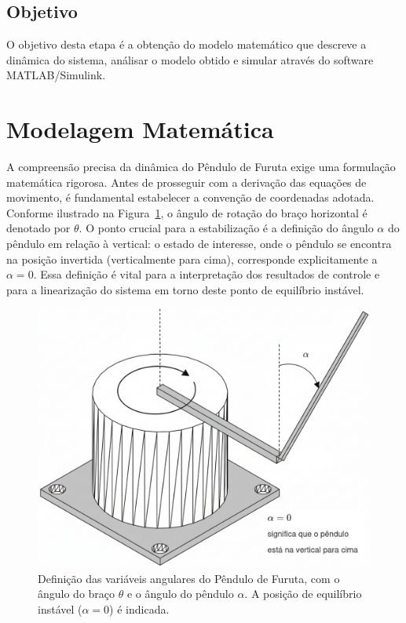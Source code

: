 \documentclass[9pt,a4paper,twocolumn,twoside]{tau-class/tau}
\begin{document}
\subsection{Objetivo}
O objetivo desta etapa é a obtenção do modelo matemático que descreve a dinâmica do sistema, 
análisar o modelo obtido e simular através do software MATLAB/Simulink.

\section{Modelagem Matemática}

A compreensão precisa da dinâmica do Pêndulo de Furuta exige uma formulação matemática rigorosa. Antes de prosseguir com a derivação das equações de movimento, é fundamental estabelecer a convenção de coordenadas adotada. Conforme ilustrado na Figura~\ref{fig:angulo_pendulo}, o ângulo de rotação do braço horizontal é denotado por \(\theta\). O ponto crucial para a estabilização é a definição do ângulo \(\alpha\) do pêndulo em relação à vertical: o estado de interesse, onde o pêndulo se encontra na posição invertida (verticalmente para cima), corresponde explicitamente a \(\alpha = 0\). Essa definição é vital para a interpretação dos resultados de controle e para a linearização do sistema em torno deste ponto de equilíbrio instável.

\begin{figure}[H]
    \centering
    \includegraphics[width=0.9\columnwidth]{figures/angulo_pendulo.png} %
    \caption{Definição das variáveis angulares do Pêndulo de Furuta, com o ângulo do braço \(\theta\) e o ângulo do pêndulo \(\alpha\). A posição de equilíbrio instável (\(\alpha=0\)) é indicada.}
    \label{fig:angulo_pendulo}
\end{figure}
\end{document}
